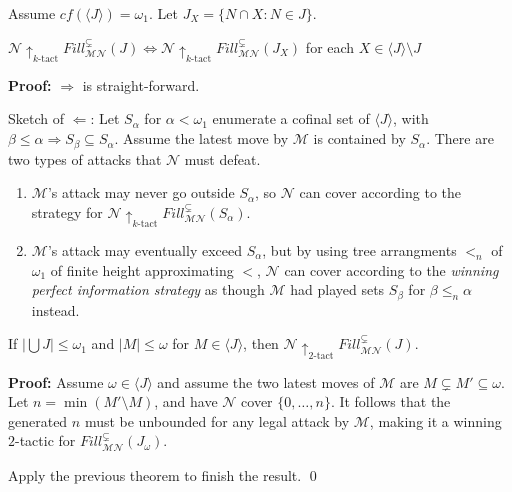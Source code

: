 \documentclass{beamer}
\theoremstyle{theorem}
\theoremstyle{definition}
\newcommand{\ktactwin}[1]{\uparrow_{#1\text{-tact}}}
\newcommand{\sfillgame}[1]{Fill^{\subsetneq}_{\pl M\pl N}(#1)}
\newcommand{\<}{\langle}
\renewcommand{\>}{\rangle}
\newcommand{\pl}[1]{\mathscr{#1}}
\begin{document}
\begin{frame}
  \begin{theorem}
    Assume $cf(\<J\>)=\omega_1$. Let $J_X = \{N\cap X : N\in J\}$.

    $\pl N\ktactwin{k}\sfillgame{J} \Leftrightarrow \pl N\ktactwin{k}\sfillgame{J_X}$ for each $X\in\<J\>\setminus J$
  \end{theorem}

  \pause

  \textbf{Proof:} 
    $\Rightarrow$ is straight-forward.

  \pause

    \vspace{12pt}

    Sketch of $\Leftarrow$: Let $S_\alpha$ for $\alpha<\omega_1$ enumerate a cofinal set of $\<J\>$, with $\beta\leq\alpha\Rightarrow S_\beta\subseteq S_\alpha$. Assume the latest move by $\pl M$ is contained by $S_\alpha$. There are two types of attacks that $\pl N$ must defeat.

  \pause

    \begin{enumerate}\small
      \item $\pl M$'s attack may never go outside $S_\alpha$, so $\pl N$ can cover according to the strategy for $\pl N\ktactwin{k}\sfillgame{S_\alpha}$.
      \pause
      \item $\pl M$'s attack may eventually exceed $S_\alpha$, but by using tree arrangments $<_n$ of $\omega_1$ of finite height approximating $<$, $\pl N$ can cover according to the \textit{winning perfect information strategy} as though $\pl M$ had played sets $S_\beta$ for $\beta\leq_n \alpha$ instead.
    \end{enumerate}
\end{frame}

\begin{frame}
  \begin{corollary}
    If $|\bigcup J| \leq \omega_1$ and $|M|\leq \omega$ for $M\in\<J\>$, then $\pl N\ktactwin{2}\sfillgame{J}$.
  \end{corollary}

  \pause

  \textbf{Proof:}
    Assume $\omega\in\<J\>$ and assume the two latest moves of $\pl M$ are $M\subsetneq M'\subseteq \omega$. Let $n=\min(M'\setminus M)$, and have $\pl N$ cover $\{0,\dots,n\}$. It follows that the generated $n$ must be unbounded for any legal attack by $\pl M$, making it a winning $2$-tactic for $\sfillgame{J_\omega}$.
    \pause

    \vspace{12pt}

    Apply the previous theorem to finish the result. \qed

\end{frame}
\end{document}
